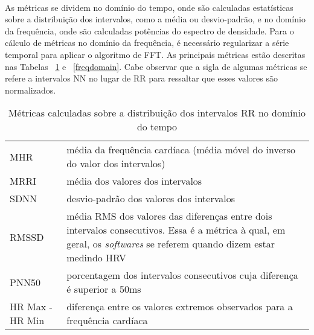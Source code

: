             \paragraph{} As métricas se dividem no domínio do tempo, onde são calculadas estatísticas sobre a distribuição dos intervalos, como a média ou desvio-padrão, e no domínio da frequência, onde são calculadas potências do espectro de densidade. Para o cálculo de métricas no domínio da frequência, é necessário regularizar a série temporal para aplicar o algoritmo de FFT. As principais métricas estão descritas nas Tabelas ~\ref{timedomain} e ~\ref{freqdomain}.  Cabe observar que a sigla de algumas métricas se refere a intervalos NN no lugar de RR para ressaltar que esses valores são normalizados.

            \begin{table}[ht!]
                \centering
                \caption{Métricas calculadas sobre a  distribuição dos intervalos RR no domínio do tempo}
                \label{timedomain}
                \begin{tabular}{l | p{8cm}}
                MHR & média da frequência cardíaca (média móvel do inverso do valor dos intervalos) \\
                MRRI  & média dos valores dos intervalos                             \\
                SDNN  & desvio-padrão dos valores dos intervalos                     \\
                RMSSD & média RMS dos valores das diferenças entre dois intervalos consecutivos. Essa é a métrica à qual, em geral, os \textit{softwares} se referem quando dizem estar medindo HRV \\
                PNN50 & porcentagem dos intervalos consecutivos cuja diferença é
                superior a 50ms \\
                HR Max - HR Min & diferença entre os valores extremos observados para a frequência cardíaca \\
                \end{tabular}
            \end{table}

